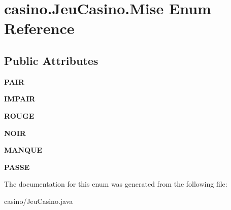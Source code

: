 \hypertarget{enumcasino_1_1_jeu_casino_1_1_mise}{}\section{casino.\+Jeu\+Casino.\+Mise Enum Reference}
\label{enumcasino_1_1_jeu_casino_1_1_mise}
\subsection*{Public Attributes}
\begin{DoxyCompactItemize}
\item 
{\bfseries P\+A\+IR}\hypertarget{enumcasino_1_1_jeu_casino_1_1_mise_af683151a02b168ff3f7df52ffadd6def}{}\label{enumcasino_1_1_jeu_casino_1_1_mise_af683151a02b168ff3f7df52ffadd6def}

\item 
{\bfseries I\+M\+P\+A\+IR}\hypertarget{enumcasino_1_1_jeu_casino_1_1_mise_a487598c718e31dd13140a3ce80c3a9de}{}\label{enumcasino_1_1_jeu_casino_1_1_mise_a487598c718e31dd13140a3ce80c3a9de}

\item 
{\bfseries R\+O\+U\+GE}\hypertarget{enumcasino_1_1_jeu_casino_1_1_mise_ab4cbbc801e16765e06f60e22e08d8adb}{}\label{enumcasino_1_1_jeu_casino_1_1_mise_ab4cbbc801e16765e06f60e22e08d8adb}

\item 
{\bfseries N\+O\+IR}\hypertarget{enumcasino_1_1_jeu_casino_1_1_mise_ac58dfa09d5ba523d7baa6a57194f350e}{}\label{enumcasino_1_1_jeu_casino_1_1_mise_ac58dfa09d5ba523d7baa6a57194f350e}

\item 
{\bfseries M\+A\+N\+Q\+UE}\hypertarget{enumcasino_1_1_jeu_casino_1_1_mise_af420eb448786ab0e870ab031883c3efb}{}\label{enumcasino_1_1_jeu_casino_1_1_mise_af420eb448786ab0e870ab031883c3efb}

\item 
{\bfseries P\+A\+S\+SE}\hypertarget{enumcasino_1_1_jeu_casino_1_1_mise_a106302554677d20d4883ddac23d03de6}{}\label{enumcasino_1_1_jeu_casino_1_1_mise_a106302554677d20d4883ddac23d03de6}

\end{DoxyCompactItemize}


The documentation for this enum was generated from the following file\+:\begin{DoxyCompactItemize}
\item 
casino/Jeu\+Casino.\+java\end{DoxyCompactItemize}
